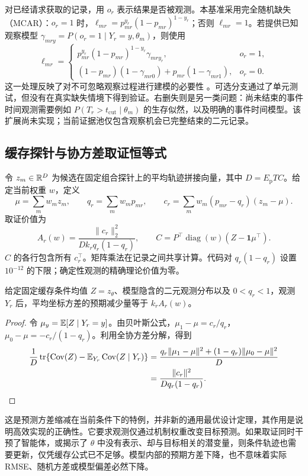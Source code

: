对已经请求获取的记录，用 $o_r$ 表示结果是否被观测。本基准采用完全随机缺失（MCAR）：$o_r=1$ 时，$\ell_{mr}=p_{mr}^{y_r}(1-p_{mr})^{1-y_r}$；否则 $\ell_{mr}=1$。若提供已知观察模型 $\gamma_{mry}=P(o_r=1\mid Y_r=y,\theta_m)$，则使用
\begin{equation}
 \ell_{mr}=\begin{cases}
 p_{mr}^{y_r}(1-p_{mr})^{1-y_r}\gamma_{mr y_r},&o_r=1,\\
 (1-p_{mr})(1-\gamma_{mr0})+p_{mr}(1-\gamma_{mr1}),&o_r=0.
 \end{cases}
 \label{eq:missing}
\end{equation}
这一处理反映了对不可忽略观察过程进行建模的必要性 \citep{rubin1976}。可选分支通过了单元测试，但没有在真实缺失情境下得到验证。右删失则是另一类问题：尚未结束的事件时间观测需要例如 $P(T_r>t_{\mathrm{cut}}\mid\theta_m)$ 的生存似然，以及明确的事件时间模型。该扩展尚未实现；当前证据池仅包含观察机会已完整结束的二元记录。

\subsection{缓存探针与协方差取证恒等式}
令 $z_m\in\mathbb{R}^D$ 为候选在固定组合探针上的平均轨迹拼接向量，其中 $D=E_{\mathrm p}TC$。给定当前权重 $w$，定义
\begin{equation}
 \mu=\sum_mw_mz_m,\qquad q_r=\sum_mw_mp_{mr},\qquad
 c_r=\sum_mw_m(p_{mr}-q_r)(z_m-\mu).
 \label{eq:cov}
\end{equation}
取证价值为
\begin{equation}
 A_r(w)=\frac{\|c_r\|_2^2}{Dk_rq_r(1-q_r)},\qquad
 C=P^\top\operatorname{diag}(w)(Z-\mathbf1\mu^\top).
 \label{eq:score}
\end{equation}
$C$ 的各行包含所有 $c_r^\top$。矩阵乘法在记录之间共享计算。代码对 $q_r(1-q_r)$ 设置 $10^{-12}$ 的下限；确定性观测的精确理论价值为零。

\begin{proposition}[二元观测的预测方差缩减]
给定固定缓存条件均值 $Z=z_\theta$、模型隐含的二元观测分布以及 $0<q_r<1$，观测 $Y_r$ 后，平均坐标方差的预期减少量等于 $k_rA_r(w)$。
\end{proposition}
\begin{proof}
令 $\mu_y=\mathbb{E}[Z\mid Y_r=y]$。由贝叶斯公式，$\mu_1-\mu=c_r/q_r$，$\mu_0-\mu=-c_r/(1-q_r)$。利用全协方差分解，得到
\begin{align}
 \frac1D\operatorname{tr}\{\operatorname{Cov}(Z)-\mathbb{E}_{Y_r}\operatorname{Cov}(Z\mid Y_r)\}
 &=\frac{q_r\|\mu_1-\mu\|^2+(1-q_r)\|\mu_0-\mu\|^2}{D}\nonumber\\
 &=\frac{\|c_r\|^2}{Dq_r(1-q_r)}.
\end{align}
\end{proof}
这是预测方差缩减在当前条件下的特例，并非新的通用最优设计定理，其作用是说明高效实现的正确性。它要求观测仅通过机制权重改变目标预测。如果取证同时干预了智能体，或揭示了 $\theta$ 中没有表示、却与目标相关的潜变量，则条件轨迹也需要更新，仅凭缓存公式已不足够。模型内部的预期方差下降，也不意味着实际 RMSE、随机方差或模型偏差必然下降。

